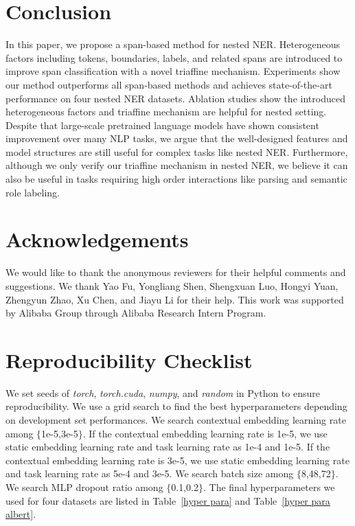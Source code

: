 \documentclass[11pt]{article}
\begin{document}
\section{Conclusion}




In this paper, we propose a span-based method for nested NER.
Heterogeneous factors including tokens, boundaries, labels, and related spans are introduced to improve span classification with a novel triaffine mechanism.
Experiments show our method outperforms all span-based methods and achieves state-of-the-art performance on four nested NER datasets.
Ablation studies show the introduced heterogeneous factors and triaffine mechanism are helpful for nested setting.
Despite that large-scale pretrained language models have shown consistent improvement over many NLP tasks, we argue that the well-designed features and model structures are still useful for complex tasks like nested NER. 
Furthermore, although we only verify our triaffine mechanism in nested NER, we believe it can also be useful in tasks requiring high order interactions like parsing and semantic role labeling.

\section*{Acknowledgements}
We would like to thank the anonymous reviewers for their helpful comments and suggestions.
We thank Yao Fu, Yongliang Shen, Shengxuan Luo, Hongyi Yuan, Zhengyun Zhao, Xu Chen, and Jiayu Li for their help.
This work was supported by Alibaba Group through Alibaba Research Intern Program.






\appendix

\section{Reproducibility Checklist}
\label{appendix:para}
We set seeds of \textit{torch}, \textit{torch.cuda}, \textit{numpy}, and \textit{random} in Python to ensure reproducibility.
We use a grid search to find the best hyperparameters depending on development set performances.
We search contextual embedding learning rate among $\{$1e-5,3e-5$\}$. If the contextual embedding learning rate is 1e-5, we use static embedding learning rate and task learning rate as 1e-4 and 1e-5. If the contextual embedding learning rate is 3e-5, we use static embedding learning rate and task learning rate as 5e-4 and 3e-5. We search batch size among $\{$8,48,72$\}$.
We search MLP dropout ratio among $\{$0.1,0.2$\}$.
The final hyperparameters we used for four datasets are listed in Table~\ref{hyper para} and Table~\ref{hyper para albert}.
\end{document}
